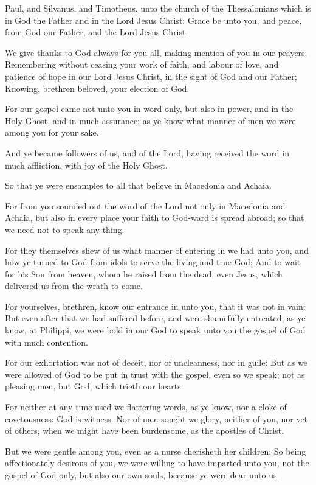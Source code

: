 \Chapter
\Verse Paul, and Silvanus, and Timotheus, unto the church of the Thessalonians which is in God the Father and in the Lord Jesus Christ: Grace be unto you, and peace, from God our Father, and the Lord Jesus Christ.

\Verse We give thanks to God always for you all, making mention of you in our prayers; \Verse Remembering without ceasing your work of faith, and labour of love, and patience of hope in our Lord Jesus Christ, in the sight of God and our Father; \Verse Knowing, brethren beloved, your election of God.

\Verse For our gospel came not unto you in word only, but also in power, and in the Holy Ghost, and in much assurance; as ye know what manner of men we were among you for your sake.

\Verse And ye became followers of us, and of the Lord, having received the word in much affliction, with joy of the Holy Ghost.

\Verse So that ye were ensamples to all that believe in Macedonia and Achaia.

\Verse For from you sounded out the word of the Lord not only in Macedonia and Achaia, but also in every place your faith to God-ward is spread abroad; so that we need not to speak any thing.

\Verse For they themselves shew of us what manner of entering in we had unto you, and how ye turned to God from idols to serve the living and true God; \Verse And to wait for his Son from heaven, whom he raised from the dead, even Jesus, which delivered us from the wrath to come.


\Chapter
\Verse For yourselves, brethren, know our entrance in unto you, that it was not in vain: \Verse But even after that we had suffered before, and were shamefully entreated, as ye know, at Philippi, we were bold in our God to speak unto you the gospel of God with much contention.

\Verse For our exhortation was not of deceit, nor of uncleanness, nor in guile: \Verse But as we were allowed of God to be put in trust with the gospel, even so we speak; not as pleasing men, but God, which trieth our hearts.

\Verse For neither at any time used we flattering words, as ye know, nor a cloke of covetousness; God is witness: \Verse Nor of men sought we glory, neither of you, nor yet of others, when we might have been burdensome, as the apostles of Christ.

\Verse But we were gentle among you, even as a nurse cherisheth her children: \Verse So being affectionately desirous of you, we were willing to have imparted unto you, not the gospel of God only, but also our own souls, because ye were dear unto us.

